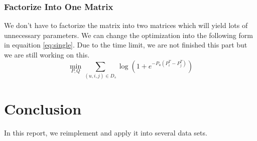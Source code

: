 \documentclass[12pt]{article}
\begin{document}
\subsubsection{Factorize Into One Matrix}
We don't have to factorize the matrix into two matrices which will yield lots of unnecessary parameters. We can change the optimization into the following form in equaition \ref{eq:single}. Due to the time limit, we are not finished this part but we are still working on this.
\begin{equation}
\min_{P,Q} \sum_{(u,i,j)\in D_s}\log(1+e^{-P_u(P_i^T - P_j^T)})
\label{eq:single}
\end{equation}

\section{Conclusion}
In this report, we reimplement and apply it into several data sets. 





	
\end{document}
